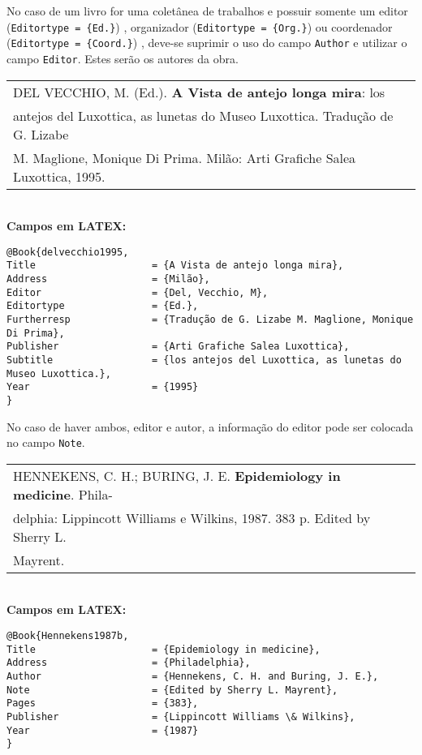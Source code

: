 No caso de um livro for uma coletânea de trabalhos e possuir somente um editor (\verb!Editortype = {Ed.}!) , organizador (\verb!Editortype = {Org.}!)  ou coordenador (\verb!Editortype = {Coord.}!) , deve-se suprimir o uso do campo \texttt{Author} e utilizar o campo \texttt{Editor}. Estes serão os autores da obra. 
	
\begin{tabular}{|l|c|} \hline
	DEL VECCHIO, M. (Ed.). \textbf{A Vista de antejo longa mira}: los      \\antejos
	del  Luxottica, as lunetas do Museo Luxottica. Tradução de G. Lizabe \\M. Maglione,  Monique Di Prima. Milão: Arti Grafiche Salea Luxottica, 1995.  \\\hline
\end{tabular}\\
	
\textbf{Campos em LATEX:}
	
\begingroup
\fontsize{10pt}{12pt}\selectfont
\begin{verbatim}
@Book{delvecchio1995,
Title                    = {A Vista de antejo longa mira},
Address                  = {Milão},
Editor                   = {Del, Vecchio, M},
Editortype               = {Ed.},
Furtherresp              = {Tradução de G. Lizabe M. Maglione, Monique 
Di Prima},
Publisher                = {Arti Grafiche Salea Luxottica},
Subtitle                 = {los antejos del Luxottica, as lunetas do 
Museo Luxottica.},
Year                     = {1995}
}
\end{verbatim}
\endgroup
	
No caso de haver ambos, editor e autor, a informação do editor pode ser colocada no campo \texttt{Note}.
	
\begin{tabular}{|l|c|} \hline
	HENNEKENS, C. H.; BURING, J. E. \textbf{Epidemiology in medicine}. Phila- \\delphia:  Lippincott Williams e Wilkins, 1987. 383 p. Edited by Sherry L. \\Mayrent. \\\hline
\end{tabular}\\
	
\textbf{Campos em LATEX:}
	
\begingroup
\fontsize{10pt}{12pt}\selectfont
\begin{verbatim}
@Book{Hennekens1987b,
Title                    = {Epidemiology in medicine},
Address                  = {Philadelphia},
Author                   = {Hennekens, C. H. and Buring, J. E.},
Note                     = {Edited by Sherry L. Mayrent},
Pages                    = {383},
Publisher                = {Lippincott Williams \& Wilkins},
Year                     = {1987}
}
\end{verbatim}
\endgroup
	
